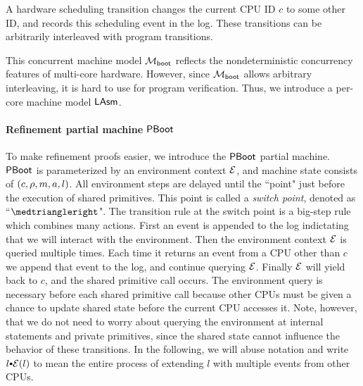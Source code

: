 A hardware scheduling transition changes the
current CPU ID $c$ to some other ID, and records this scheduling event
in the log. These transitions can be arbitrarily interleaved with
program transitions.

This concurrent machine model $\mathcal{M}_{\mathsf{boot}}$
reflects the nondeterministic concurrency features of 
multi-core hardware. However, since $\mathcal{M}_{\mathsf{boot}}$ allows arbitrary interleaving,
it is hard to use for program verification. Thus, we introduce
a per-core machine model $\mathsf{LAsm}$.

\vspace{-2pt}
\paragraph{Refinement partial machine $\mathsf{PBoot}$}
To make refinement proofs easier, we introduce the $\mathsf{PBoot}$ partial machine.
$\mathsf{PBoot}$ is parameterized by an environment context $\mathcal{E}$,
and machine state consists of $(c, \rho, m, a, l)$. All environment steps
are delayed until the ``point" just before the execution of shared primitives. 
This point is called a \emph{switch point}, denoted as ``$\intp$".
The transition rule at the switch point
is a big-step rule which combines many actions. First an event is
appended to the log indictating that we will interact with the
environment. Then the environment context $\mathcal{E}$ is queried
multiple times. Each time it returns an event from a CPU other than
$c$ we append that event to the log, and continue querying
$\mathcal{E}$. Finally $\mathcal{E}$ will yield back to $c$, and
the shared primitive call occurs.
The environment query is necessary before each shared primitive call because 
other CPUs must be given a chance to update shared state before the current 
CPU accesses it. Note, however, that we do not need to worry about querying
the environment at internal statements and private primitives, since
the shared state cannot influence the behavior of these
transitions. In the following, we will abuse notation and write
$l \cons \oracle(l)$ to mean the entire process of extending $l$ with
multiple events from other CPUs.

